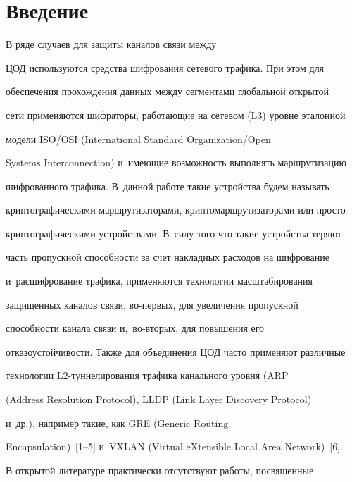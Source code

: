       







\section{Введение}





  В ряде случаев для защиты каналов связи между 


ЦОД используются средства шифрования сетевого трафика. При этом для 


обеспечения прохождения данных между сегментами глобальной открытой 


сети применяются шифраторы, работающие на сетевом (L3) уровне эталонной 


модели ISO\!/\!OSI (International Standard Organization/Open


Systems Interconnection) и~имеющие возможность выполнять маршрутизацию 


шифрованного трафика. В~данной работе такие устройства будем называть 


криптографическими маршрутизаторами, криптомаршрутизаторами или просто 


криптографическими устройствами. В~силу того что такие устройства теряют 


часть пропускной способности за счет накладных расходов на шифрование 


и~расшифрование трафика, применяются технологии масштабирования 


защищенных каналов связи, во-пер\-вых, для увеличения пропускной 


способности канала связи и,~во-вто\-рых, для повышения его 


отказоустойчивости. Также для объединения ЦОД часто применяют различные 


технологии L2-тун\-не\-ли\-ро\-ва\-ния трафика канального уровня (ARP


(Address Resolution Protocol), LLDP (Link Layer Discovery Protocol) 


и~др.), например такие, как GRE (Generic Routing


Encapsulation)~[1--5] и~VXLAN (Virtual eXtensible Local Area Network)~[6].


  


  В открытой литературе практически отсутствуют работы, посвященные 


